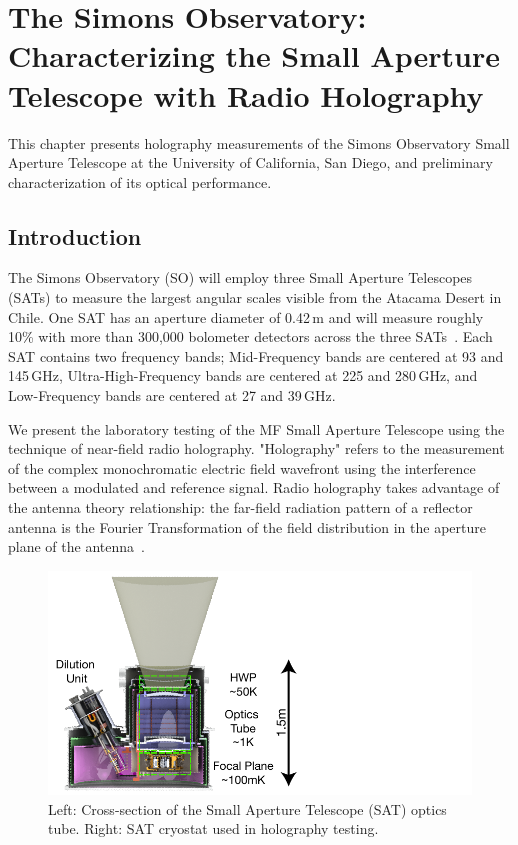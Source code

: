 \chapter{The Simons Observatory: Characterizing the Small Aperture Telescope with Radio Holography}
\label{ch:sat_holo}
This chapter presents holography measurements of the Simons Observatory Small Aperture Telescope at the University of California, San Diego, and preliminary characterization of its optical performance.
\section{Introduction}
The Simons Observatory (SO) will employ three Small Aperture Telescopes (SATs) to measure the largest angular scales visible from the Atacama Desert in Chile.  One SAT has an aperture diameter of 0.42\,m and will measure roughly 10\% with more than 300,000 bolometer detectors across the three SATs~\cite{2020SPIE11445E..7LK}.  Each SAT contains two frequency bands; Mid-Frequency bands are centered at 93 and 145\,GHz, Ultra-High-Frequency bands are centered at 225 and 280\,GHz, and Low-Frequency bands are centered at 27 and 39\,GHz.  

We present the laboratory testing of the MF Small Aperture Telescope using the technique of near-field radio holography.  "Holography" refers to the measurement of the complex monochromatic electric field wavefront using the interference between a modulated and reference signal.  Radio holography takes advantage of the antenna theory relationship: the far-field radiation pattern of a reflector antenna is the Fourier Transformation of the field distribution in the aperture plane of the antenna~\cite{alma_holog}.

\begin{figure}[ht]
    \centering
    \includegraphics[width = .95\textwidth]{Figures/sat_optics.pdf}
    \caption{Left: Cross-section of the Small Aperture Telescope (SAT) optics tube.  Right: SAT cryostat used in holography testing.}
    \label{fig:sat_optics}
\end{figure}

